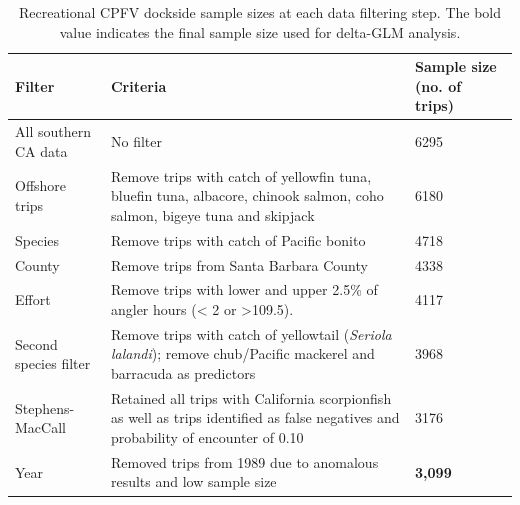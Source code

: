 \documentclass[12pt,]{article}
\begin{document}
\FloatBarrier

\begin{table}[ht]
\centering
\caption{Recreational CPFV dockside sample 
                                          sizes at each data filtering step.  
                                          The bold value indicates the final sample size 
                                          used for delta-GLM analysis.} 
\label{tab:Fleet5_RecPC_dockside_filter}
\begin{tabular}{>{\raggedright}p{1.5in}>{\raggedright}p{3in}>{\raggedright}p{1in}}
  \hline
Filter & Criteria & Sample size (no. of trips) \\ 
  \hline
All southern CA data & No filter & 6295 \\ 
  Offshore trips & Remove trips with catch of yellowfin tuna, bluefin tuna, albacore, chinook salmon, coho salmon, bigeye tuna and skipjack & 6180 \\ 
  Species &  Remove trips with  catch of Pacific bonito & 4718 \\ 
  County &  Remove trips from Santa Barbara County & 4338 \\ 
  Effort & Remove trips with lower and upper 2.5\% of angler hours (< 2 or   >109.5). & 4117 \\ 
  Second species filter & Remove trips with catch of yellowtail (\emph{Seriola lalandi}); remove chub/Pacific mackerel and barracuda as predictors & 3968 \\ 
  Stephens-MacCall & Retained all trips with California scorpionfish as well as trips identified as false negatives and probability of encounter of 0.10 & 3176 \\ 
  Year & Removed trips from 1989 due to anomalous results and low sample size  & \textbf{3,099} \\ 
   \hline
\end{tabular}
\end{table}\vspace{2in}
\end{document}
